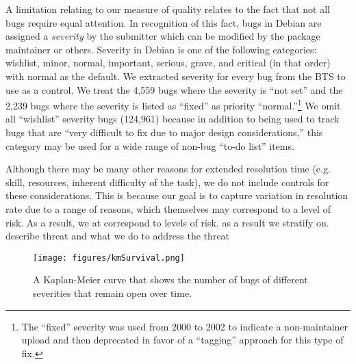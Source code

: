 \documentclass[10pt,conference]{IEEEtran}\usepackage[]{graphicx}\usepackage[usenames,dvipsnames]{color}
\begin{document}
A limitation relating to our measure of quality relates to the fact that not all bugs require equal attention. In recognition of this fact, bugs in Debian are assigned a \textit{severity} by the submitter which can be modified by the package maintainer or others.  Severity in Debian is one of the following categories: wishlist, minor, normal, important, serious, grave, and critical (in that order) with normal as the default.
We extracted severity for every bug from the BTS to use as a control. We treat the  4,559 bugs where the severity is ``not set'' and the 2,239 bugs where the severity is listed as ``fixed'' as priority ``normal.''\footnote{The ``fixed'' severity was used from 2000 to 2002 to indicate a non-maintainer upload and then deprecated in favor of a ``tagging'' approach for this type of fix.}
We omit all ``wishlist'' severity bugs (124,961) because in addition to being used to track bugs that are ``very difficult to fix due to major design considerations,'' this category may be used for a wide range of non-bug ``to-do list'' items. %

Although there may be many other reasons for extended resolution time (e.g. skill, resources, inherent difficulty of the task), we do not include controls for these considerations. This is because our goal is to capture variation in resolution rate due to a range of reasons, which themselves may correspond to a level of risk. As a result, we at correspond to levels of risk. as a result we stratify on. describe threat and what we do to address the threat

\begin{figure}
\texttt{[image: figures/kmSurvival.png]}
\caption{A Kaplan-Meier curve that shows the number of bugs of different severities that remain open over time. \label{fig:kmSurvival}}
\end{figure} 
\end{document}
